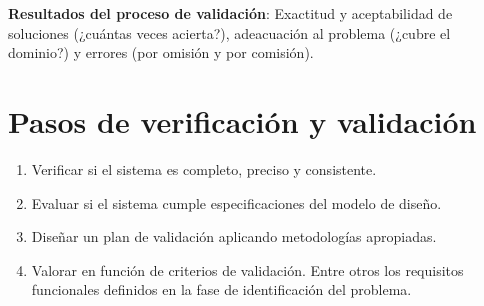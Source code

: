 \documentclass[12pt]{article}
\begin{document}
\textbf{Resultados del proceso de validación}: Exactitud y aceptabilidad de soluciones (¿cuántas veces acierta?), adeacuación al problema (¿cubre el dominio?) y errores (por omisión y por comisión).

\section{Pasos de verificación y validación}
\begin{enumerate}
\item Verificar si el sistema es completo, preciso y consistente.
\item Evaluar si el sistema cumple especificaciones del modelo de diseño.
\item Diseñar un plan de validación aplicando metodologías apropiadas.
\item Valorar en función de criterios de validación. Entre otros los requisitos funcionales definidos en la fase de identificación del problema.
\end{enumerate}
\end{document}

